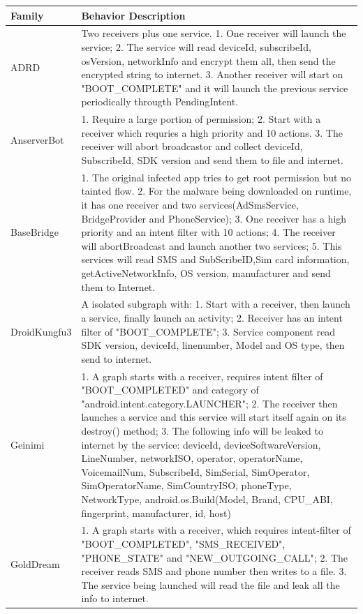 \documentclass{sig-alternate}
\begin{document}
\begin{table}
\begin{center}
    \begin{tabular}{ | l | p{15cm} |}
    \hline
  \hline
  Family & Behavior Description  \\
  \hline
  ADRD & Two receivers plus one service. 1. One receiver will launch the service; 
  2. The service will read  deviceId, subscribeId, osVersion, networkInfo and encrypt them all, then send the encrypted string to internet. 3. Another receiver will start on "BOOT\_COMPLETE" and it will launch the previous service periodically througth PendingIntent.  \\
    \hline
  AnserverBot & 1. Require a large portion of permission; 2. Start with a receiver which requries a high priority and 10 actions. 3. The receiver will abort broadcastor and collect deviceId, SubscribeId, SDK version and send them to file and internet. \\
    \hline
  BaseBridge & 1. The original infected app tries to get root permission but no tainted flow. 2. For the malware being downloaded on runtime, it has one receiver and two services(AdSmsService, BridgeProvider and PhoneService); 3. One receiver has a high priority and an intent filter with 10 actions; 4. The receiver will abortBroadcast and launch another two services; 5. This services will read SMS and SubScribeID,Sim card information, getActiveNetworkInfo, OS version, manufacturer and send them to Internet. \\
    \hline
  DroidKungfu3 & A isolated subgraph with: 1. Start with a receiver, then launch a service, finally launch an activity; 2. Receiver has an intent filter of "BOOT\_COMPLETE"; 3. Service component read SDK version, deviceId, linenumber, Model and OS type, then send to internet. \\
    \hline
  Geinimi & 1. A graph starts with a receiver, requires intent filter of "BOOT\_COMPLETED" and category of "android.intent.category.LAUNCHER"; 2. The receiver then launches a service and this service will start itself again on its destroy() method; 3. The following info will be leaked to internet by the service: deviceId, deviceSoftwareVersion, LineNumber, networkISO, operator, operatorName, VoicemailNum, SubscribeId, SimSerial, SimOperator, SimOperatorName, SimCountryISO, phoneType, NetworkType, android.os.Build(Model, Brand, CPU\_ABI, fingerprint, manufacturer, id, host) \\
    \hline
  GoldDream & 1. A graph starts with a receiver, which requires intent-filter of "BOOT\_COMPLETED", "SMS\_RECEIVED", "PHONE\_STATE" and "NEW\_OUTGOING\_CALL"; 2. The receiver reads SMS and phone number then writes to a file. 3. The service being launched will read the file and leak all the info to internet. \\

\end{tabular}
\end{center}
\end{table}
\end{document}
